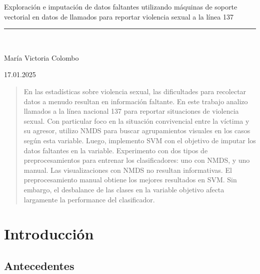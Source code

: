 \documentclass[10 pt]{article}
\begin{document}
\begin{titlepage}
\begin{center}
\begin{large}
    \vspace*{0.15in}
    Exploración e imputación de datos faltantes utilizando máquinas de soporte vectorial en datos de llamados para reportar violencia sexual a la línea 137 \\
    
    
    \end{large}
    \vspace*{0.2in}
    \vspace*{0.3in}
    
    
    \vspace*{0.3in}
    \rule{80mm}{0.1mm}\\
    \vspace*{0.1in}
    \begin{large}
    María Victoria Colombo
    
    \vspace*{0.3in}
    
    \vspace*{0.1in}17.01.2025
    \end{large}
    \end{center}
    
    \end{titlepage}

\newpage

\begin{abstract}
    En las estadísticas sobre violencia sexual, las dificultades para recolectar datos a menudo resultan en información faltante. En este trabajo analizo llamados a la línea nacional 137 para reportar situaciones de violencia sexual. Con particular foco en la situación convivencial entre la víctima y su agresor, utilizo NMDS para buscar agrupamientos visuales en los casos según esta variable. Luego, implemento SVM con el objetivo de imputar los datos faltantes en la variable. Experimento con dos tipos de preprocesamientos para entrenar los clasificadores: uno con NMDS, y uno manual. Las visualizaciones con NMDS no resultan informativas. El preprocesamiento manual obtiene los mejores resultados en SVM. Sin embargo, el desbalance de las clases en la variable objetivo afecta largamente la performance del clasificador.  
\end{abstract}
\newpage
\tableofcontents
\newpage

\section{Introducción}\label{intro}

\subsection{Antecedentes}
\end{document}
